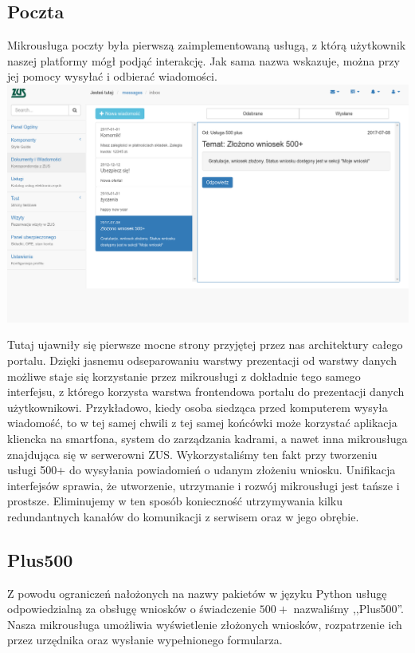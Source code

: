 \documentclass[licencjacka]{pracamgr}
\begin{document}
\subsection{Poczta}
Mikrousługa poczty była pierwszą zaimplementowaną usługą, z którą użytkownik
naszej platformy mógł podjąć interakcję. Jak sama nazwa wskazuje, można przy jej
pomocy wysyłać i odbierać wiadomości.\\
\includegraphics[width=\textwidth]{obrazki/poczta.png}

Tutaj ujawniły się pierwsze mocne strony przyjętej przez nas architektury całego
portalu. Dzięki jasnemu odseparowaniu warstwy prezentacji od warstwy danych
możliwe staje się korzystanie przez mikrousługi z dokładnie tego samego interfejsu,
z którego korzysta warstwa frontendowa portalu do prezentacji danych użytkownikowi.
Przykładowo, kiedy osoba siedząca przed komputerem wysyła wiadomość, to w tej samej
chwili z tej samej końcówki może korzystać aplikacja kliencka na smartfona, system
do zarządzania kadrami, a nawet inna mikrousługa znajdująca się w serwerowni ZUS.
Wykorzystaliśmy ten fakt przy tworzeniu usługi 500+ do wysyłania powiadomień o
udanym złożeniu wniosku.
Unifikacja interfejsów sprawia, że utworzenie, utrzymanie i rozwój mikrousługi jest
tańsze i prostsze. Eliminujemy w ten sposób konieczność utrzymywania kilku redundantnych
kanałów do komunikacji z serwisem oraz w jego obrębie.

\subsection{Plus500}

Z powodu ograniczeń nałożonych na nazwy pakietów w języku Python usługę odpowiedzialną
za obsługę wniosków o świadczenie $500+$ nazwaliśmy ,,Plus500''. Nasza mikrousługa
umożliwia wyświetlenie złożonych wniosków, rozpatrzenie ich przez urzędnika oraz
wysłanie wypełnionego formularza.
\end{document}
